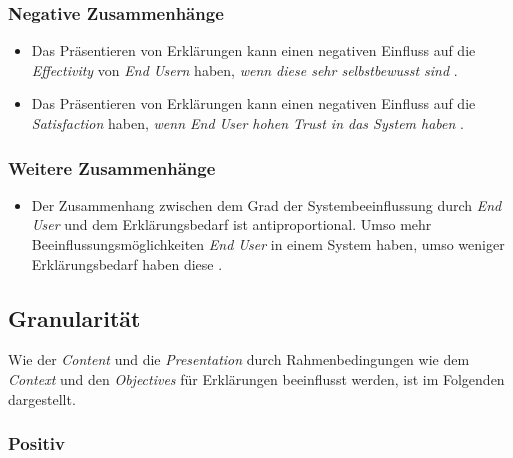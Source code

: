 \subsubsection*{Negative Zusammenhänge}

\begin{itemize}
    \item Das Präsentieren von Erklärungen kann einen negativen Einfluss auf die \textit{Effectivity} von \textit{End Usern} haben, \textit{wenn diese sehr selbstbewusst sind} \cite{schaffer_i_2019}.
    \item Das Präsentieren von Erklärungen kann einen negativen Einfluss auf die \textit{Satisfaction} haben, \textit{wenn End User hohen Trust in das System haben} \cite{rosenfeld_explainability_2019, doshi2017towards}.
\end{itemize}

\subsubsection*{Weitere Zusammenhänge}

\begin{itemize}
    \item Der Zusammenhang zwischen dem Grad der Systembeeinflussung durch \textit{End User} und dem Erklärungsbedarf ist antiproportional. Umso mehr Beeinflussungsmöglichkeiten \textit{End User} in einem System haben, umso weniger Erklärungsbedarf haben diese \cite{rosenfeld_explainability_2019}.
\end{itemize}

\newpage

\subsection*{Granularität}

Wie der \textit{Content} und die \textit{Presentation} durch Rahmenbedingungen wie dem \textit{Context} und den \textit{Objectives} für Erklärungen beeinflusst werden, ist im Folgenden dargestellt.

\subsubsection*{Positiv}

